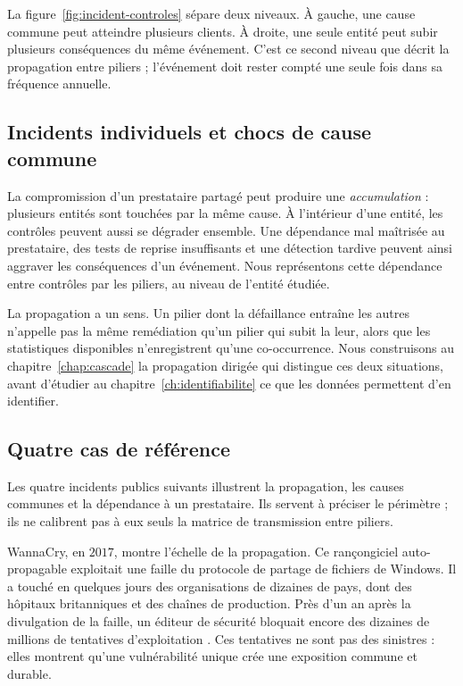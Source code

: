 La figure~\ref{fig:incident-controles} sépare deux niveaux. À gauche, une cause commune peut
atteindre plusieurs clients. À droite, une seule entité peut subir plusieurs conséquences
du même événement. C'est ce second niveau que décrit la propagation entre piliers ; l'événement
doit rester compté une seule fois dans sa fréquence annuelle.

\subsection{Incidents individuels et chocs de cause commune}
\label{subsec:chocs-cause-commune}

La compromission d'un prestataire partagé peut produire une \emph{accumulation} : plusieurs
entités sont touchées par la même cause. À l'intérieur d'une entité, les contrôles peuvent aussi
se dégrader ensemble. Une dépendance mal maîtrisée au prestataire, des tests de reprise insuffisants
et une détection tardive peuvent ainsi aggraver les conséquences d'un événement. Nous représentons
cette dépendance entre contrôles par les piliers, au niveau de l'entité étudiée.

La propagation a un sens. Un pilier dont la défaillance entraîne les autres n'appelle pas la même
remédiation qu'un pilier qui subit la leur, alors que les statistiques disponibles n'enregistrent
qu'une co-occurrence. Nous construisons au chapitre~\ref{chap:cascade} la propagation dirigée qui distingue ces deux situations, avant d'étudier au chapitre~\ref{ch:identifiabilite} ce que les données
permettent d'en identifier.

\subsection{Quatre cas de référence}
\label{subsec:cas-cyber}

Les quatre incidents publics suivants illustrent la propagation, les causes communes et la
dépendance à un prestataire. Ils servent à préciser le périmètre ; ils ne calibrent pas à eux seuls
la matrice de transmission entre piliers.

WannaCry, en $2017$, montre l'échelle de la propagation. Ce rançongiciel auto-propagable exploitait
une faille du protocole de partage de fichiers de Windows. Il a touché en quelques jours des
organisations de dizaines de pays, dont des hôpitaux britanniques et des chaînes de production.
Près d'un an après la divulgation de la faille, un éditeur de sécurité bloquait encore des dizaines
de millions de tentatives d'exploitation \citep{avast2018wannacry}. Ces tentatives ne sont pas des
sinistres : elles montrent qu'une vulnérabilité unique crée une exposition commune et durable.

